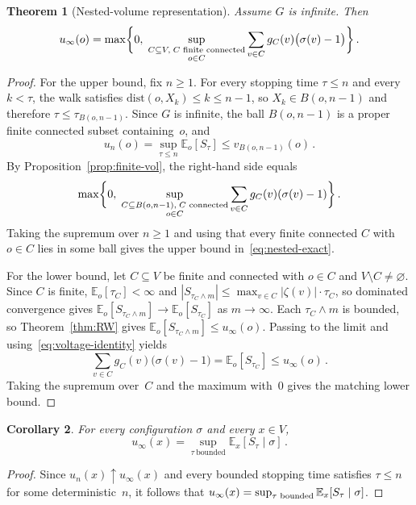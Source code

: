 \documentclass[aop]{imsart}
\theoremstyle{plain}
\newtheorem{theorem}{Theorem}[section]
\newtheorem{corollary}[theorem]{Corollary}
\theoremstyle{definition}
\newcommand{\E}{\mathbb{E}}
\begin{document}
	\begin{theorem}[Nested-volume representation]\label{thm:nested-vol}
		Assume $G$ is infinite. Then
		\begin{equation}\label{eq:nested-exact}
			u_\infty(o)=\max\biggl\{0,\;\sup_{\substack{C\subseteq V,\; C\textup{ finite connected}\\ o\in C}}\sum_{v\in C}g_C(v)\bigl(\sigma(v)-1\bigr)\biggr\}\,.
		\end{equation}
	\end{theorem}
	
	\begin{proof}
		For the upper bound, fix $n\geq 1$. For every stopping time $\tau\leq n$ and every $k<\tau$, the walk satisfies $\mathrm{dist}(o,X_k)\leq k\leq n-1$, so $X_k\in B(o,n-1)$ and therefore $\tau\leq\tau_{B(o,n-1)}$. Since $G$ is infinite, the ball $B(o,n-1)$ is a proper finite connected subset containing~$o$, and
		\[
		u_n(o)=\sup_{\tau\leq n}\E_o[S_\tau]\leq v_{B(o,n-1)}(o)\,.
		\]
		By Proposition~\ref{prop:finite-vol}, the right-hand side equals
		\[
		\max\biggl\{0,\;\sup_{\substack{C\subseteq B(o,n-1),\; C\textup{ connected}\\ o\in C}}\sum_{v\in C} g_C(v)(\sigma(v)-1)\biggr\}\,.
		\]
		Taking the supremum over $n\geq 1$ and using that every finite connected $C$ with $o\in C$ lies in some ball gives the upper bound in~\eqref{eq:nested-exact}.
		
		For the lower bound, let $C\subseteq V$ be finite and connected with $o\in C$ and $V\setminus C\neq\varnothing$. Since $C$ is finite, $\E_o[\tau_C]<\infty$ and $|S_{\tau_C\wedge m}|\leq\max_{v\in C}|\zeta(v)|\cdot\tau_C$, so dominated convergence gives $\E_o[S_{\tau_C\wedge m}]\to\E_o[S_{\tau_C}]$ as $m\to\infty$. Each $\tau_C\wedge m$ is bounded, so Theorem~\ref{thm:RW} gives $\E_o[S_{\tau_C\wedge m}]\leq u_\infty(o)$. Passing to the limit and using~\eqref{eq:voltage-identity} yields
		\[
		\sum_{v\in C}g_C(v)\bigl(\sigma(v)-1\bigr)=\E_o[S_{\tau_C}]\leq u_\infty(o)\,.
		\]
		Taking the supremum over~$C$ and the maximum with~$0$ gives the matching lower bound.
	\end{proof}
	
	\begin{corollary}\label{cor:RW-infinite}
		For every configuration $\sigma$ and every $x\in V$,
		\[
		u_\infty(x)=\sup_{\tau\ \mathrm{bounded}}\E_x[S_\tau\mid\sigma]\,.
		\]
	\end{corollary}
	\begin{proof}
		Since $u_n(x)\uparrow u_\infty(x)$ and every bounded stopping time satisfies $\tau\leq n$ for some deterministic~$n$, it follows that $u_\infty(x)=\sup_{\tau\textup{ bounded}}\E_x[S_\tau\mid\sigma]$.
	\end{proof}
	
\end{document}
